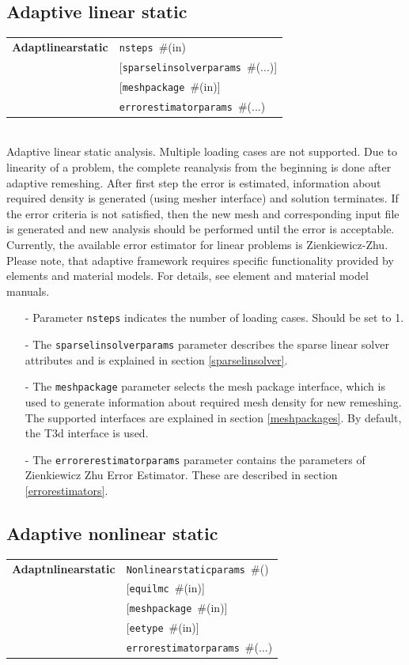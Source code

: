\documentclass[a4paper]{article}
\makeatletter
\newcommand{\param}[1]{\texttt{#1}} %
\newcommand{\optional}[1]{[#1]} %
\newcommand{\field}[2]{\param{#1}~\#{\tiny(#2)}} %
\newcommand{\optField}[2]{\optional{\field{#1}{#2}}}
\newcommand{\entKeywordInst}[1]{\textbf{#1}} %
\newenvironment{record}[1][]{\begin{tabular}{|ll}}{\end{tabular}\\}
\newcommand{\recentry}[2]{{#1}&{#2}\\}
\newcounter{rcc}
\newenvironment{record}[1][\textwidth]{\setcounter{rcc}{0}\begin{tabular*}{#1}{|ll@{\extracolsep{\fill}}r}}{\end{tabular*}\\}
\newcommand{\recentry}[2]{\ifthenelse{\value{rcc}>0}{&$\backslash$ \\}{\setcounter{rcc}{1}}{#1}&{#2}}
\makeatother
\begin{document}
\subsection{Adaptive linear static}
\label{AdaptiveLinearStatic}
\begin{record}
  \recentry{\entKeywordInst{Adaptlinearstatic}}{\field{nsteps}{in}}
  \recentry{}{\optField{sparselinsolverparams}{...}}
  \recentry{}{\optField{meshpackage}{in}}
  \recentry{}{\field{errorestimatorparams}{...}}
\end{record}
Adaptive linear static analysis. Multiple loading cases are not
supported. Due to linearity of a problem, the complete reanalysis from
the beginning is done after adaptive remeshing.
After first step the error is estimated, information about required density is generated
(using mesher interface) and solution terminates. If the error
criteria is not satisfied, then the new mesh
and corresponding input file is generated and new analysis should be
performed until the error is acceptable.
Currently, the available error estimator for linear problems is
Zienkiewicz-Zhu. Please note, that adaptive framework requires
specific functionality provided by elements and material models. For
details, see element and material model manuals.
\begin{itemize}
\item[-]
Parameter \param{nsteps} indicates the number of loading cases.
Should be set to 1.
\item[-]
The  \param{sparselinsolverparams} parameter describes the sparse
linear solver attributes and is explained in section \ref{sparselinsolver}.
\item[-]
The \param{meshpackage} parameter selects the mesh package interface,
which is used to generate information about required mesh density for
new remeshing. The supported interfaces are explained in section
\ref{meshpackages}. By default, the T3d interface is used.
\item[-]
The \param{errorerestimatorparams} parameter contains the parameters
of Zien\-kie\-wicz Zhu Error Estimator. These are described in section \ref{errorestimators}.
\end{itemize}


\subsection{Adaptive nonlinear static}

\begin{record}
  \recentry{\entKeywordInst{Adaptnlinearstatic}}{\field{Nonlinearstaticparams}{}}
  \recentry{}{\optField{equilmc}{in}}
  \recentry{}{\optField{meshpackage}{in}}
  \recentry{}{\optField{eetype}{in}}
  \recentry{}{\field{errorestimatorparams}{...}}
\end{record}
\end{document}
